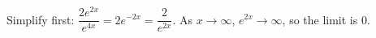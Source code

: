 Simplify first: $\dfrac{2e^{2x}}{e^{4x}}=2e^{-2x}=\dfrac{2}{e^{2x}}$. As $x\to\infty$, $e^{2x}\to\infty$, so the limit is $\boxed{0}$.
